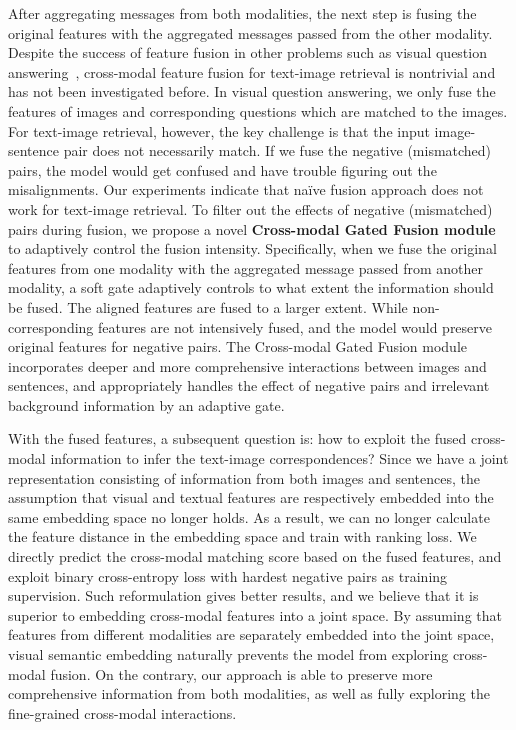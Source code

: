 \documentclass[10pt,twocolumn,letterpaper]{article}
\begin{document}
After aggregating messages from both modalities, the next step is fusing the original features with the aggregated messages passed from the other modality.
Despite the success of feature fusion in other problems such as visual question answering~\cite{fukui2016multimodal,gao2016compact,kim2016hadamard,yu2017multi,nguyen2018improved}, cross-modal feature fusion for text-image retrieval is nontrivial and has not been investigated before. 
In visual question answering, we only fuse the features of images and corresponding questions which are matched to the images.
For text-image retrieval, however, the key challenge is that the input image-sentence pair does not necessarily match. 
If we fuse the negative (mismatched) pairs, the model would get confused and have trouble figuring out the misalignments.
Our experiments indicate that na\"ive fusion approach does not work for text-image retrieval. 
To filter out the effects of negative (mismatched) pairs during fusion, we propose a novel \textbf{Cross-modal Gated Fusion module} to adaptively control the fusion intensity. 
Specifically, when we fuse the original features from one modality with the aggregated message passed from another modality, a soft gate adaptively controls to what extent the information should be fused. 
The aligned features are fused to a larger extent. 
While non-corresponding features are not intensively fused, and the model would preserve original features for negative pairs. 
The Cross-modal Gated Fusion module incorporates deeper and more comprehensive interactions between images and sentences, and appropriately handles the effect of negative pairs and irrelevant background information by an adaptive gate.



With the fused features, a subsequent question is: how to exploit the fused cross-modal information to infer the text-image correspondences? 
Since we have a joint representation consisting of information from both images and sentences, the assumption that visual and textual features are respectively embedded into the same embedding space no longer holds. 
As a result, we can no longer calculate the feature distance in the embedding space and train with ranking loss. 
We directly predict the cross-modal matching score based on the fused features, and exploit binary cross-entropy loss with hardest negative pairs as training supervision. 
Such reformulation gives better results, and we believe that it is superior to embedding cross-modal features into a joint space. 
By assuming that features from different modalities are separately embedded into the joint space, visual semantic embedding naturally prevents the model from exploring cross-modal fusion.
On the contrary, our approach is able to preserve more comprehensive information from both modalities, as well as fully exploring the fine-grained cross-modal interactions. 
\end{document}
